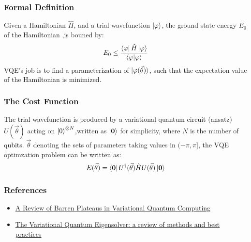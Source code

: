 \documentclass{beamer}
\begin{document}
\begin{frame}
    \frametitle{Formal Definition}
    Given a Hamiltonian \(\hat{H}\), and a trial wavefunction \(\ket{\varphi}\), the ground state energy \(E_0\) of the Hamiltonian ,is bouned by:
    \begin{equation}
        E_0 \leq \frac{\bra{\varphi} \hat{H} \ket{\varphi}}{\braket{\varphi | \varphi}}
    \end{equation}
    VQE's job is to find a parameterization of \(\ket{\varphi(\vec{\theta})}\), such that the expectation value of the Hamiltonian is minimized.
\end{frame}

\begin{frame}
    \frametitle{The Cost Function}
    The trial wavefunction is produced by a variational quantum circuit (ansatz) \(U(\vec{\theta})\) acting on \(\ket{0}^{\otimes N}\),written as \(\ket{\textbf{0}}\) for simplicity, where \(N\) is the number of qubits. \(\vec{\theta}\) denoting the sets of parameters taking values in \((- \pi, \pi]\), the VQE optimzation problem can be written as:
    \begin{equation}
        E(\vec{\theta}) = \bra{\textbf{0}} U^{\dagger}(\vec{\theta}) \hat{H} U(\vec{\theta}) \ket{\textbf{0}}
    \end{equation}
\end{frame}
\begin{frame}
    \frametitle{References}
    \begin{itemize}
        \item \href{https://arxiv.org/pdf/2405.00781}{A Review of Barren Plateaus in Variational Quantum Computing}
        \item \href{https://arxiv.org/pdf/2111.05176}{The Variational Quantum Eigensolver: a review of methods and best practices}
    \end{itemize}
\end{frame}
\end{document}
